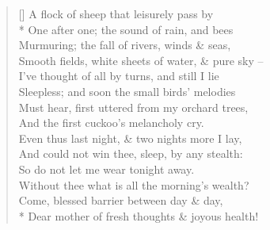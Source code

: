 \documentclass[MAIN]{subfiles}
\begin{document}
\settowidth{\versewidth}{A flock of sheep that leisurely pass by}
\begin{verse}[\versewidth]
A flock of sheep that leisurely pass by\\*
\vin One after one; the sound of rain, and bees\\
\vin Murmuring; the fall of rivers, winds \& seas,\\
Smooth fields, white sheets of water, \& pure sky --\\
I've thought of all by turns, and still I lie\\
\vin Sleepless; and soon the small birds' melodies\\
\vin Must hear, first uttered from my orchard trees,\\
And the first cuckoo's melancholy cry.\\
Even thus last night, \& two nights more I lay,\\
\vin And could not win thee, sleep, by any stealth:\\
So do not let me wear tonight away.\\
\vin Without thee what is all the morning's wealth?\\
Come, blessed barrier between day \& day,\\*
\vin Dear mother of fresh thoughts \& joyous health!
\end{verse}
\end{document}
